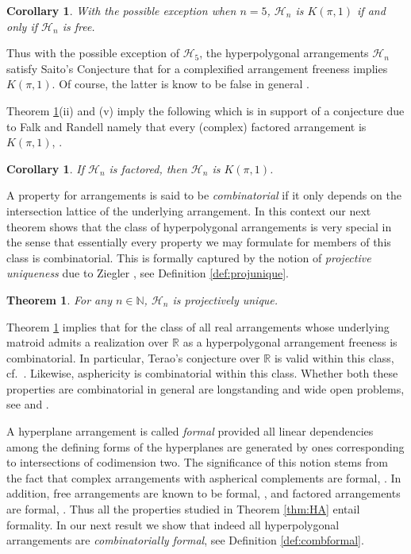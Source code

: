 \documentclass[12pt]{amsart}
\newcommand\CH{{\mathscr H}}
\newcommand\BBN{{\mathbb N}}
\newcommand\BBR{{\mathbb R}}
\numberwithin{equation}{section}
\theoremstyle{plain}
\newtheorem{theorem}[equation]{Theorem}
\newtheorem{corollary}[equation]{Corollary}
\theoremstyle{definition}
\begin{document}
\begin{corollary}
	\label{cor:kpi1}
	With the possible exception when $n=5$, 
	$\CH_n$ is $K(\pi,1)$ if and only if  $\CH_n$ is free. 
\end{corollary}

Thus with the possible exception of $\CH_5$, the hyperpolygonal arrangements 
$\CH_n$ satisfy Saito's Conjecture that for a complexified arrangement freeness implies $K(\pi,1)$. Of course, the latter is know to be false in general \cite{edelmanreiner:saito}.

Theorem \ref{thm:HAiscomb}(ii) and (v) imply the following which  
is in support of a conjecture due to Falk and Randell namely that every (complex) factored  arrangement is  $K(\pi,1)$, \cite[Probl.~3.12]{falkrandell:homotopyII}.

\begin{corollary}
	\label{cor:kpi1-2}
	If $\CH_n$ is factored, then $\CH_n$  is $K(\pi,1)$. 
\end{corollary}

A property for arrangements is said to be \emph{combinatorial} if it only depends on the intersection lattice of the underlying arrangement.
In this context our next theorem shows that the class of hyperpolygonal arrangements is
very special in the sense that essentially every property
we may formulate for members of this class is
combinatorial. This is formally captured by the notion of \emph{projective uniqueness} due to Ziegler \cite{ziegler:matroid}, see Definition \ref{def:projunique}.

\begin{theorem}
	\label{thm:HAiscomb}
	For any $n \in \BBN$,  $\CH_n$ is projectively unique.
\end{theorem}

Theorem \ref{thm:HAiscomb} implies that 
for the class of all real arrangements whose underlying matroid admits a realization over $\BBR$ as a hyperpolygonal arrangement 
freeness is combinatorial. In particular, Terao's conjecture over $\BBR$ is valid within this class, cf.~\cite[Prop.~2.3]{ziegler:matroid}. Likewise, asphericity is combinatorial within this class. Whether both these properties are combinatorial in general are longstanding and wide open problems, see  \cite[Conj.~4.138]{orlikterao:arrangements} and \cite[Prob.~3.8]{falkrandell:homotopyII}.

\bigskip

A hyperplane arrangement is called \emph{formal} provided all linear dependencies among the defining forms of the hyperplanes are generated by ones corresponding to intersections  of codimension two.
The significance of this notion stems from the fact that
complex arrangements with aspherical complements are formal, \cite[Thm.\ 4.2]{falkrandell:homotopy}.
In addition, free arrangements are known to be formal,
\cite[Cor.~2.5]{yuzvinsky:obstruction},
and factored arrangements are formal, \cite[Thm.~1.1]{moellermueckschroehre:formal}.
Thus all the properties studied in Theorem \ref{thm:HA} entail formality.  
In our next result we show that indeed  
all hyperpolygonal arrangements are \emph{combinatorially formal}, see Definition \ref{def:combformal}.
\end{document}

